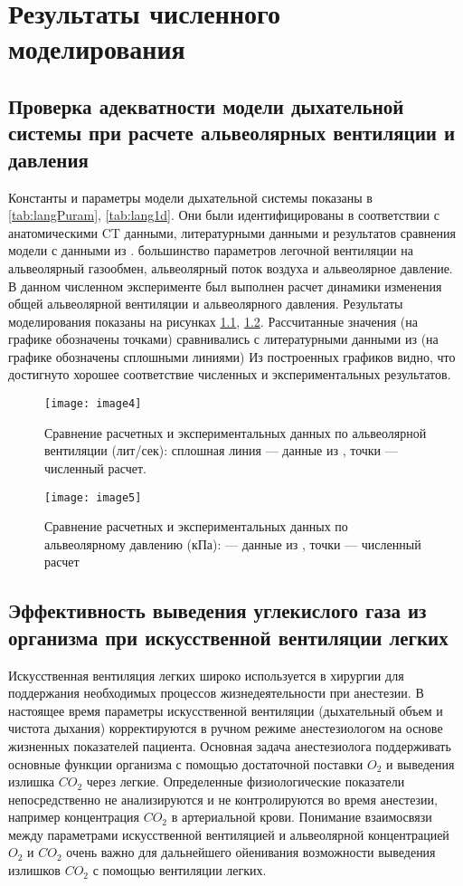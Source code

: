 \chapter{Результаты численного моделирования}

\section{Проверка адекватности модели дыхательной системы при расчете альвеолярных вентиляции и давления}
Константы и параметры модели дыхательной системы показаны в \ref{tab:langPuram}, \ref{tab:lang1d}. 
Они были идентифицированы в соответствии с анатомическими CT данными, литературными данными \cite{bental2013,Simakov2009,Mead1961} и результатов сравнения модели с данными из \cite{schmidt}.  большинство параметров легочной вентиляции на альвеолярный газообмен, альвеолярный поток воздуха и альвеолярное давление. В данном численном эксперименте был выполнен расчет динамики изменения общей альвеолярной вентиляции и альвеолярного давления. Результаты моделирования показаны на рисунках \ref{image4}, \ref{image5}. Рассчитанные значения (на графике обозначены точками) сравнивались с литературными данными из \cite{schmidt} (на графике обозначены сплошными линиями)  Из построенных графиков видно, что достигнуто хорошее соответствие численных и экспериментальных результатов.

\begin{figure}[!ht]
	\centering
	\texttt{[image: image4]}
	\caption{Сравнение расчетных и экспериментальных данных по альвеолярной вентиляции (лит/сек): сплошная линия --- данные из \cite{schmidt}, точки --- численный расчет.} 
	\label{image4}	
\end{figure}

\begin{figure}[!ht]
	\centering
	\texttt{[image: image5]}
	\caption{Сравнение расчетных и экспериментальных данных по альвеолярному давлению (кПа): --- данные из \cite{schmidt}, точки --- численный расчет} 
	\label{image5}
\end{figure}


\section{ Эффективность выведения углекислого газа из организма при искусственной вентиляции легких}

Искусственная вентиляция легких широко используется в хирургии для поддержания необходимых процессов жизнедеятельности при анестезии. В настоящее время параметры искусственной вентиляции (дыхательный объем и чистота дыхания) корректируются в ручном режиме анестезиологом на основе жизненных показателей пациента.  Основная задача анестезиолога поддерживать основные функции организма с помощью достаточной поставки $O_{2} $ и выведения излишка $CO_{2} $ через легкие. Определенные физиологические показатели непосредственно не анализируются и не контролируются во время анестезии, например концентрация $CO_{2} $ в артериальной крови. Понимание взаимосвязи между параметрами искусственной вентиляцией и альвеолярной концентрацией $O_{2} $ и $CO_{2} $ очень важно для дальнейшего ойенивания возможности выведения излишков $CO_{2} $ с помощью вентиляции легких. 

